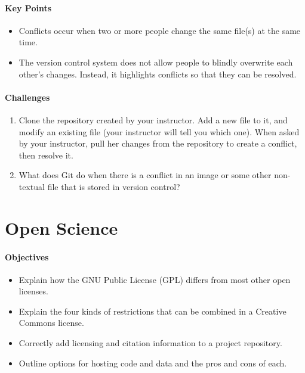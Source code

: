 \documentclass[]{book}
\begin{document}
\mbox{}\paragraph{Key Points}

\begin{itemize}
\item
  Conflicts occur when two or more people change the same file(s) at the
  same time.
\item
  The version control system does not allow people to blindly overwrite
  each other's changes. Instead, it highlights conflicts so that they
  can be resolved.
\end{itemize}

\mbox{}\paragraph{Challenges}

\begin{enumerate}
\item
  Clone the repository created by your instructor. Add a new file to it,
  and modify an existing file (your instructor will tell you which one).
  When asked by your instructor, pull her changes from the repository to
  create a conflict, then resolve it.
\item
  What does Git do when there is a conflict in an image or some other
  non-textual file that is stored in version control?
\end{enumerate}

\section{Open Science}

\mbox{}\paragraph{Objectives}

\begin{itemize}
\item
  Explain how the GNU Public License (GPL) differs from most other open
  licenses.
\item
  Explain the four kinds of restrictions that can be combined in a
  Creative Commons license.
\item
  Correctly add licensing and citation information to a project
  repository.
\item
  Outline options for hosting code and data and the pros and cons of
  each.
\end{itemize}
\end{document}
